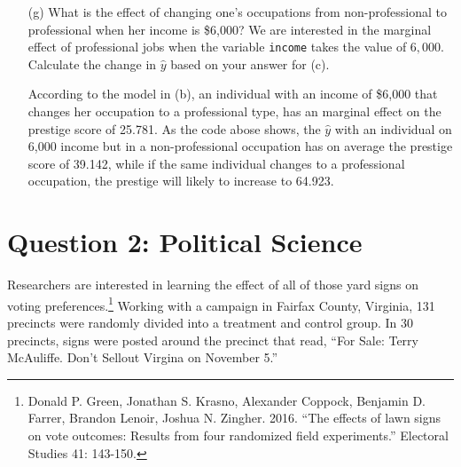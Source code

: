 \documentclass[12pt,letterpaper]{article}
\begin{document}
\begin{enumerate}
	 
	
	According to the model in (b), an increase of \$1000 in the income of an individual that has an occupation type professional has an marginal effect of 1 unit on the prestige score. Simulating the predicted  $\hat{y}$ for incomes of 1000, 2000 and 3000 as the code above shows, and keeping constant the occupation as professional (=1), there is an increase of 1 associated in the prestige scale.
	
		
	\item [(g)]
	What is the effect of changing one's occupations from non-professional to professional when her income is \$6,000? We are interested in the marginal effect of professional jobs when the variable \texttt{income} takes the value of $6,000$. Calculate the change in $\hat{y}$ based on your answer for (c).
	
	 	

	According to the model in (b), an individual with an income of \$6,000 that changes her occupation to a professional type, has an marginal effect on the prestige score of 25.781. As the code abose shows, the $\hat{y}$ with an individual on 6,000 income but in a non-professional occupation has on average the prestige score of 39.142, while if the same individual changes to a professional occupation, the prestige will likely to increase to 64.923.
	
	
\end{enumerate}

\newpage

\section*{Question 2: Political Science}
\vspace{.25cm}
Researchers are interested in learning the effect of all of those yard signs on voting preferences.\footnote{Donald P. Green, Jonathan	S. Krasno, Alexander Coppock, Benjamin D. Farrer,	Brandon Lenoir, Joshua N. Zingher. 2016. ``The effects of lawn signs on vote outcomes: Results from four randomized field experiments.'' Electoral Studies 41: 143-150. } Working with a campaign in Fairfax County, Virginia, 131 precincts were randomly divided into a treatment and control group. In 30 precincts, signs were posted around the precinct that read, ``For Sale: Terry McAuliffe. Don't Sellout Virgina on November 5.'' 
\end{document}
